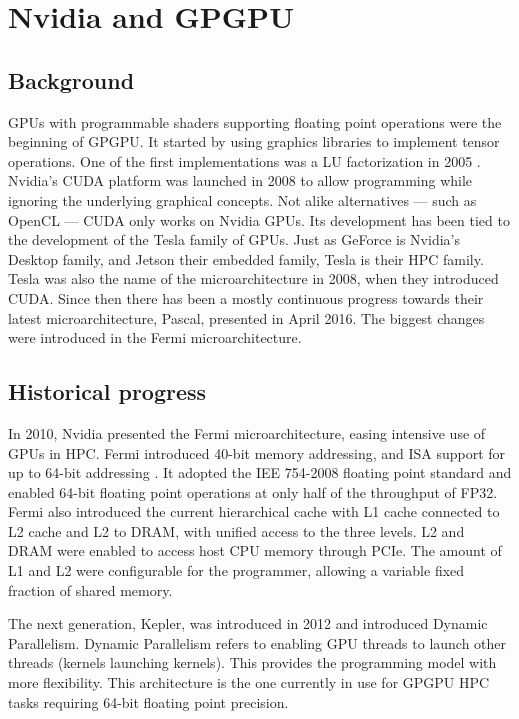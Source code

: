 
\section{Nvidia and GPGPU}

\subsection{Background}
GPUs with programmable shaders supporting floating point operations were the beginning of GPGPU.
It started by using graphics libraries to implement tensor operations.
One of the first implementations was a LU factorization in 2005 \cite{du2012cuda}.
Nvidia's CUDA platform was launched in 2008 to allow programming while ignoring the underlying graphical concepts.
Not alike alternatives --- such as OpenCL --- CUDA only works on Nvidia GPUs.
Its development has been tied to the development of the Tesla family of GPUs.
Just as GeForce is Nvidia's Desktop family, and Jetson their embedded family, Tesla is their HPC family.
Tesla was also the name of the microarchitecture in 2008, when they introduced CUDA.
Since then there has been a mostly continuous progress towards their latest microarchitecture, Pascal, presented in April 2016.
The biggest changes were introduced in the Fermi microarchitecture.

\subsection{Historical progress}
In 2010, Nvidia presented the Fermi microarchitecture, easing intensive use of GPUs in HPC.
Fermi introduced 40-bit memory addressing, and ISA support for up to 64-bit addressing \cite{nickolls2010gpu}.
It adopted the IEE 754-2008 floating point standard and enabled 64-bit floating point operations at only half of the throughput of FP32.
Fermi also introduced the current hierarchical cache with L1 cache connected to L2 cache and L2 to DRAM, with unified access to the three levels.
L2 and DRAM were enabled to access host CPU memory through PCIe.
The amount of L1 and L2 were configurable for the programmer, allowing a variable fixed fraction of shared memory.

The next generation, Kepler, was introduced in 2012 and introduced Dynamic Parallelism.
Dynamic Parallelism refers to enabling GPU threads to launch other threads (kernels launching kernels).
This provides the programming model with more flexibility.
This architecture is the one currently in use for GPGPU HPC tasks requiring 64-bit floating point precision.

